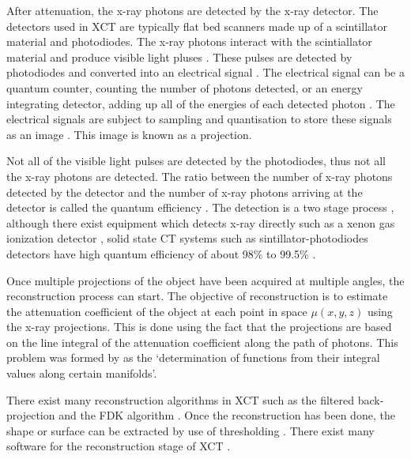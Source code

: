 After attenuation, the x-ray photons are detected by the x-ray detector. The detectors used in XCT are typically flat bed scanners made up of a scintillator material \citep{curran1953luminescence, greskovich1997ceramic} and photodiodes. The x-ray photons interact with the scintiallator material and produce visible light pluses \citep{rossner1993conversion}. These pulses are detected by photodiodes and converted into an electrical signal \citep{nikl2006scintillation, ren2018tutorial}. The electrical signal can be a quantum counter, counting the number of photons detected, or an energy integrating detector, adding up all of the energies of each detected photon \citep{nikl2006scintillation, whiting2006properties, kruth2011computed, ren2018tutorial}. The electrical signals are subject to sampling and quantisation to store these signals as an image \citep{cierniak2011x}. This image is known as a projection.

Not all of the visible light pulses are detected by the photodiodes, thus not all the x-ray photons are detected. The ratio between the number of x-ray photons detected by the detector and the number of x-ray photons arriving at the detector is called the quantum efficiency \citep{cierniak2011x, ren2018tutorial}. The detection is a two stage process \citep{cierniak2011x}, although there exist equipment which detects x-ray directly such as a xenon gas ionization detector \citep{fuchs2000direct}, solid state CT systems such as sintillator-photodiodes detectors have high quantum efficiency of about 98\% to 99.5\% \citep{hsieh2000investigation}.

Once multiple projections of the object have been acquired at multiple angles, the reconstruction process can start. The objective of reconstruction is to estimate the attenuation coefficient of the object at each point in space $\mu(x,y,z)$ using the x-ray projections. This is done using the fact that the projections are based on the line integral of the attenuation coefficient along the path of photons. This problem was formed by \cite{radon1986on} as the `determination of functions from their integral values along certain manifolds'.

There exist many reconstruction algorithms in XCT \citep{smith1990cone} such as the filtered back-projection \citep{brooks1976principles} and the FDK algorithm \citep{feldkamp1984practical}. Once the reconstruction has been done, the shape or surface can be extracted by use of thresholding \citep{kruth2011computed}. There exist many software for the reconstruction stage of XCT \citep{reinhart2008industrial, sun2012overview}.

